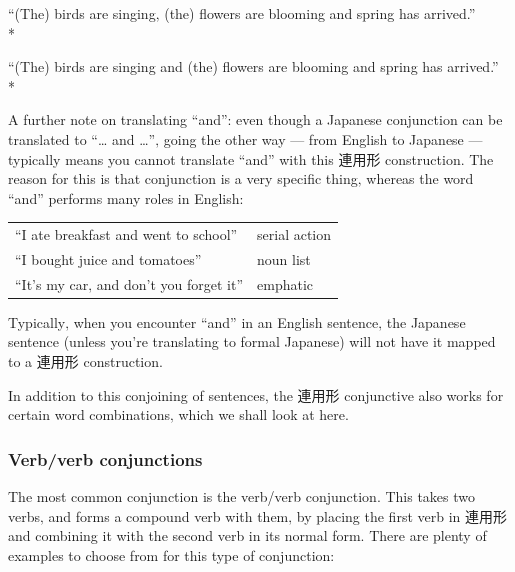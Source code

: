 \documentclass[11pt, b5paper, twoside, openright, onecolumn]{book}
\newenvironment{exampleblock}{
\setlength{\parindent}{0.6in}
\begin{minipage}[t]{\dimexpr\textwidth-\parindent}}
{\end{minipage}}
\newenvironment{mytabularcentered}[1]{\noindent
\begin{center}\begin{tabular}[h]{#1}}{\end{tabular}\end{center}}
\begin{document}
\begin{exampleblock}
“(The) birds are singing‚ (the) flowers are blooming and spring has arrived.” \\* 
\end{exampleblock}
\vspace{0.2cm}

\begin{exampleblock}
“(The) birds are singing and (the) flowers are blooming and spring has arrived.” \\* 
\end{exampleblock}
\vspace{0.2cm}

A further note on translating “and”: even though a Japanese conjunction can be translated to “… and …”‚ going the other way — from English to Japanese — typically means you cannot translate “and” with this 連用形 construction. The reason for this is that conjunction is a very specific thing‚ whereas the word “and” performs many roles in English:

\vspace{0.5cm}
\smaller
\begin{center}
\begin{mytabularcentered}{| l  l |}\hline 
\rule{0pt}{2.4ex}“I ate breakfast and went to school” & \index[english]{Serial action}serial action\\ 
\rule{0pt}{2.4ex}“I bought juice and tomatoes” & \index[english]{Noun list}noun list\\ 
\rule{0pt}{2.4ex}“It’s my car‚ and don’t you forget it” & \index[english]{Emphatic}emphatic\\ 
\hline 
\end{mytabularcentered}
\end{center}
\larger
\vspace{0.5cm}


Typically‚ when you encounter “and” in an English sentence‚ the Japanese sentence (unless you’re translating to formal Japanese) will not have it mapped to a 連用形 construction.

In addition to this conjoining of sentences‚ the 連用形 conjunctive also works for certain word combinations‚ which we shall look at here.

\subsubsection{Verb/verb conjunctions}

The most common conjunction is the verb/verb conjunction. This takes two verbs‚ and forms a compound verb with them‚ by placing the first verb in 連用形 and combining it with the second verb in its normal form. There are plenty of examples to choose from for this type of conjunction:
\end{document}
